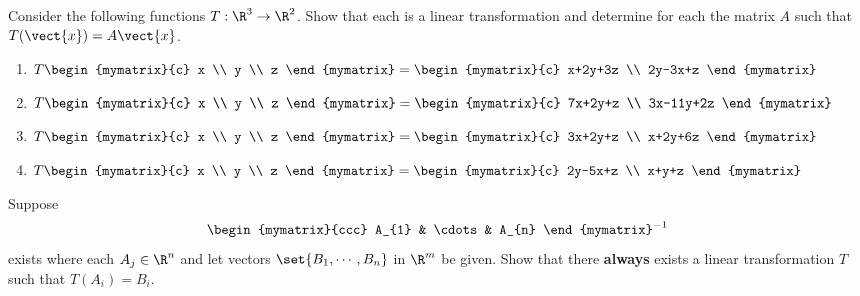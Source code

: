 \begin{enumialphparenastyle}
\begin{ex} Consider the following functions $T:\R^{3}\rightarrow \R^{2}$.
Show that each is a linear transformation and determine for each the matrix $A$ such that 
$T(\vect{x})=A\vect{x}$.

\begin{enumerate}
\item $T\begin{mymatrix}{c}
x \\
y \\
z
\end{mymatrix} =\begin{mymatrix}{c}
x+2y+3z \\
2y-3x+z
\end{mymatrix} $

\item $T\begin{mymatrix}{c}
x \\
y \\
z
\end{mymatrix} =\begin{mymatrix}{c}
7x+2y+z \\
3x-11y+2z
\end{mymatrix} $

\item $T\begin{mymatrix}{c}
x \\
y \\
z
\end{mymatrix} =\begin{mymatrix}{c}
3x+2y+z \\
x+2y+6z
\end{mymatrix} $

\item $T\begin{mymatrix}{c}
x \\
y \\
z
\end{mymatrix} =\begin{mymatrix}{c}
2y-5x+z \\
x+y+z
\end{mymatrix} $
\end{enumerate}
\end{ex}


\begin{ex} Suppose 
\begin{equation*}
\begin{mymatrix}{ccc}
A_{1} & \cdots & A_{n}
\end{mymatrix} ^{-1}
\end{equation*}
 exists where each $A_{j}\in \R^{n}$ and let
vectors  $\set{B_{1},\cdots ,B_{n}} $ in $\R^{m}$ be given. 
Show that there \textbf{always }exists a linear
transformation $T$ such that $T(A_{i})=B_{i}$.
\end{ex}

\end{enumialphparenastyle}